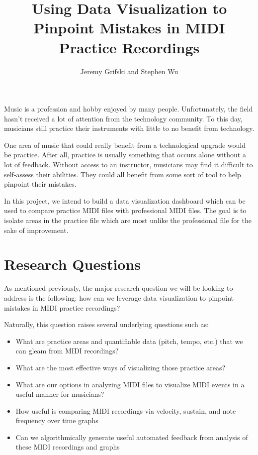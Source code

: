 \documentclass[journal]{vgtc}                %
\title{Using Data Visualization to Pinpoint Mistakes in MIDI Practice Recordings}
\author{Jeremy Grifski and Stephen Wu}
\begin{document}

\maketitle

Music is a profession and hobby enjoyed by many people. Unfortunately, the
field hasn't received a lot of attention from the technology community. To
this day, musicians still practice their instruments with little to no
benefit from technology.

One area of music that could really benefit from a technological upgrade would
be practice. After all, practice is usually something that occurs alone without
a lot of feedback. Without access to an instructor, musicians may find it difficult
to self-assess their abilities. They could all benefit from some sort of tool
to help pinpoint their mistakes.

In this project, we intend to build a data visualization dashboard which can
be used to compare practice MIDI files with professional MIDI files. The goal
is to isolate areas in the practice file which are most unlike the professional
file for the sake of improvement.

\section{Research Questions}

As mentioned previously, the major research question we will be looking to
address is the following: how can we leverage data visualization to pinpoint
mistakes in MIDI practice recordings?

Naturally, this question raises several underlying questions such as:

\begin{itemize}
\item What are practice areas and quantifiable data (pitch, tempo, etc.) that
we can gleam from MIDI recordings?
\item What are the most effective ways of visualizing those practice areas?
\item What are our options in analyzing MIDI files to visualize MIDI events
in a useful manner for musicians?
\item How useful is comparing MIDI recordings via velocity, sustain, and note
frequency over time graphs
\item Can we algorithmically generate useful automated feedback from analysis
of these MIDI recordings and graphs
\end{itemize}
\end{document}
